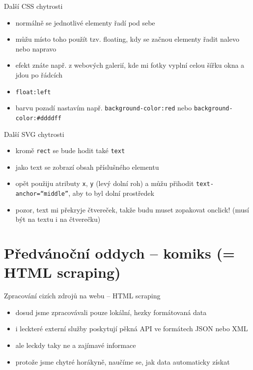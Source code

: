 \documentclass{beamer}
\begin{document}
\begin{frame}{Další CSS chytrosti}
  \begin{itemize}
    \item normálně se jednotlivé elementy řadí pod sebe
    \item můžu místo toho použít tzv. floating, kdy se začnou elementy řadit nalevo nebo napravo
    \item efekt znáte např. z webových galerií, kde mi fotky vyplní celou šířku okna a jdou po řádcích
    \item \texttt{float:left}
    \item barvu pozadí nastavím např. \texttt{background-color:red} nebo \texttt{background-color:\#ddddff}
  \end{itemize}
\end{frame}


\begin{frame}{Další SVG chytrosti}
  \begin{itemize}
    \item kromě \texttt{rect} se bude hodit také \texttt{text}
    \item jako text se zobrazí obsah příslušného elementu
    \item opět použiju atributy \texttt{x}, \texttt{y} (levý dolní roh) a můžu přihodit \texttt{text-anchor=``middle''}, aby to byl dolní prostředek
    \item pozor, text mi překryje čtvereček, takže budu muset zopakovat onclick! (musí být na textu i na čtverečku)
  \end{itemize}
\end{frame}

\section{Předvánoční oddych -- komiks (= HTML scraping)}

\begin{frame}{Zpracování cizích zdrojů na webu -- HTML scraping}
  \begin{itemize}
    \item dosud jsme zpracovávali pouze lokální, hezky formátovaná data
    \item i leckteré externí služby poskytují pěkná API ve formátech JSON nebo XML
    \item ale leckdy taky ne a zajímavé informace
    \item protože jsme chytré horákyně, naučíme se, jak data automaticky získat
  \end{itemize}
\end{frame}
\end{document}
